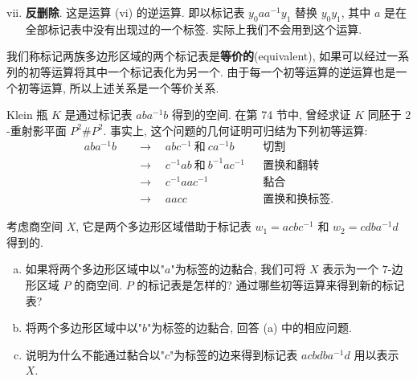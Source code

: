 \begin{enumerate}[(i)]
\setcounter{enumi}{6}
\item \textbf{反删除}. 这是运算 (vi) 的逆运算. 即以标记表 $y_{0}aa^{-1}y_{1}$ 替换 $y_{0}y_{1}$, 其中 $a$ 是在全部标记表中没有出现过的一个标签. 实际上我们不会用到这个运算.
\end{enumerate}

\begin{definition}[等价的标记表]
\label{definition:ch12-equivalent-schemes}
我们称标记两族多边形区域的两个标记表是\textbf{等价的}(equivalent), 如果可以经过一系列的初等运算将其中一个标记表化为另一个. 由于每一个初等运算的逆运算也是一个初等运算, 所以上述关系是一个等价关系.
\end{definition}

\begin{example}
\label{example:ch12-klein-reduction}
Klein 瓶 $K$ 是通过标记表 $aba^{-1}b$ 得到的空间. 在第 74 节中, 曾经求证 $K$ 同胚于 $2$-重射影平面 $P^{2}\#P^{2}$. 事实上, 这个问题的几何证明可归结为下列初等运算:
\begin{align*}
aba^{-1}b\quad&\longrightarrow\quad abc^{-1}\ \text{和}\ ca^{-1}b &&\text{切割}\\
&\longrightarrow\quad c^{-1}ab\ \text{和}\ b^{-1}ac^{-1} &&\text{置换和翻转}\\
&\longrightarrow\quad c^{-1}aac^{-1} &&\text{黏合}\\
&\longrightarrow\quad aacc &&\text{置换和换标签}.
\end{align*}
\end{example}

\begin{exercise}
\label{exercise:ch12-sec76-01}
考虑商空间 $X$, 它是两个多边形区域借助于标记表 $w_{1}=acbc^{-1}$ 和 $w_{2}=cdba^{-1}d$ 得到的.
\begin{enumerate}[(a)]
\item 如果将两个多边形区域中以"$a$"为标签的边黏合, 我们可将 $X$ 表示为一个 $7$-边形区域 $P$ 的商空间. $P$ 的标记表是怎样的? 通过哪些初等运算来得到新的标记表?
\item 将两个多边形区域中以"$b$"为标签的边黏合, 回答 (a) 中的相应问题.
\item 说明为什么不能通过黏合以"$c$"为标签的边来得到标记表 $acbdba^{-1}d$ 用以表示 $X$.
\end{enumerate}
\end{exercise}


